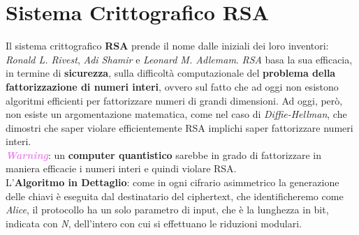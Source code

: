 \newpage
\section{Sistema Crittografico RSA}
Il sistema crittografico \textbf{RSA} prende il nome dalle iniziali dei loro inventori: \textit{Ronald L. Rivest}, \textit{Adi Shamir} e \textit{Leonard M. Adlemam}. \textit{RSA} basa la sua efficacia, in termine di \textbf{sicurezza}, sulla difficoltà computazionale del \textbf{problema della fattorizzazione di numeri interi}, ovvero sul fatto che ad oggi non esistono algoritmi efficienti per fattorizzare numeri di grandi dimensioni. Ad oggi, però, non esiste un argomentazione matematica, come nel caso di \textit{Diffie-Hellman}, che dimostri che saper violare efficientemente RSA implichi saper fattorizzare numeri interi. \\
\textcolor{violet}{\textbf{\textit{Warning}}}: un \textbf{computer quantistico} sarebbe in grado di fattorizzare in maniera efficacie i numeri interi e quindi violare RSA.
\\ \newline
L'\textbf{Algoritmo in Dettaglio}: come in ogni cifrario asimmetrico la generazione delle chiavi è eseguita dal destinatario del ciphertext, che identificheremo come \textit{Alice}, il protocollo ha un solo parametro di input, che è la lunghezza in bit, indicata con \textit{N}, dell'intero con cui si effettuano le riduzioni modulari.
